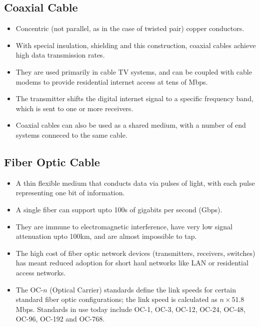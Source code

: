 \documentclass{article}
\theoremstyle{plain}
\theoremstyle{definition}
\begin{document}
\subsection{Coaxial Cable}
\begin{itemize}
    \item Concentric (not parallel, as in the case of twisted pair) copper conductors. 
    
    \item With special insulation, shielding and this construction, coaxial cables achieve high data transmission rates.
    
    \item They are used primarily in cable TV systems, and can be coupled with cable modems to provide residential internet access at tens of Mbps. 
    
    \item The transmitter shifts the digital internet signal to a specific frequency band, which is sent to one or more receivers. 
    
    \item Coaxial cables can also be used as a shared medium, with a number of end systems conneced to the same cable. 
\end{itemize}

\subsection{Fiber Optic Cable}
\begin{itemize}
    \item A thin flexible medium that conducts data via pulses of light, with each pulse representing one bit of information. 
    
    \item A single fiber can support upto 100s of gigabits per second (Gbps). 
    
    \item They are immune to electromagnetic interference, have very low signal attenuation upto 100km, and are almost impossible to tap. 
    
    \item The high cost of fiber optic network devices (transmitters, receivers, switches) has meant reduced adoption for short haul networks like LAN or residential access networks. 
    
    \item The OC-$n$ (Optical Carrier) standards define the link speeds for certain standard fiber optic configurations; the link speed is calculated as $n \times 51.8$ Mbps. Standards in use today include OC-1, OC-3, OC-12, OC-24, OC-48, OC-96, OC-192 and OC-768. 
\end{itemize}
\end{document}
